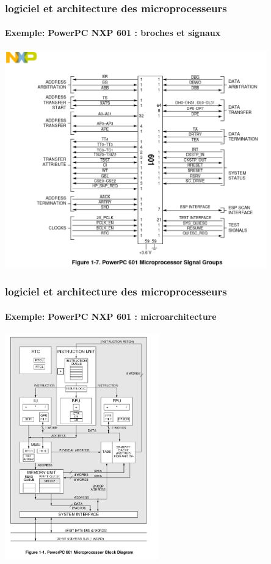 \documentclass[xcolor=svgnames,final,smaller,a4]{beamer}
\begin{document}
\begin{frame}
  \frametitle{logiciel et architecture des microprocesseurs}
  \framesubtitle{Exemple: PowerPC NXP 601 : broches et signaux}

  \includegraphics[width=0.85\textwidth]{powerpc-nxp-601}


\end{frame}
\begin{frame}
  \frametitle{logiciel et architecture des microprocesseurs}
  \framesubtitle{Exemple: PowerPC NXP 601 : microarchitecture}

  \includegraphics[width=0.50\textwidth]{powerpc601-microarchitecture}


\end{frame}
\end{document}
